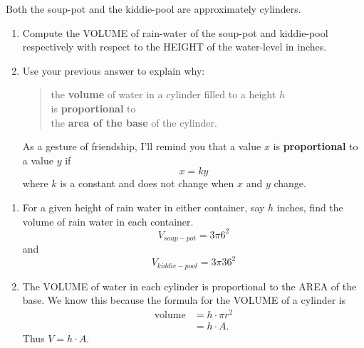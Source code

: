 \documentclass[nooutcomes,noauthor,hints]{ximera}
\begin{document}
\begin{question}
  Both the soup-pot and the kiddie-pool are approximately cylinders.
  \begin{enumerate}
  \item Compute the VOLUME of rain-water of the soup-pot and
    kiddie-pool respectively with respect to the HEIGHT of the
    water-level in inches.
  \item Use your previous answer to explain why:
    \begin{quote}
      the \textbf{volume} of water in a cylinder filled to a height $h$ \\ \quad is
      \textbf{proportional} to \\
      \quad\quad the \textbf{area of the base} of the cylinder.
    \end{quote}
    As a gesture of friendship, I'll remind you that a value $x$ is
    \textbf{proportional} to a value $y$ if
  \[
  x = k y
  \]
  where $k$ is a constant and does not change when $x$ and $y$ change.
  \end{enumerate}
  \begin{freeResponse}
    \begin{enumerate}
      \item For a given height of rain water in either container, say
        $h$ inches, find the volume of rain water in each container.
        \[
        V_{soup-pot} = 3 \pi 6^2
        \]
        and
        \[
        V_{kiddie-pool} = 3 \pi 36^2 
        \]
      \item The VOLUME of water in each cylinder is proportional to
        the AREA of the base. We know this because the formula for the
        VOLUME of a cylinder is
        \begin{align*}
          \text{volume} &= h \cdot \pi r^2\\
          &= h \cdot A.
        \end{align*}
        Thus $V = h\cdot A$.
    \end{enumerate}
  \end{freeResponse}
\end{question}
\mynewpage
\end{document}
